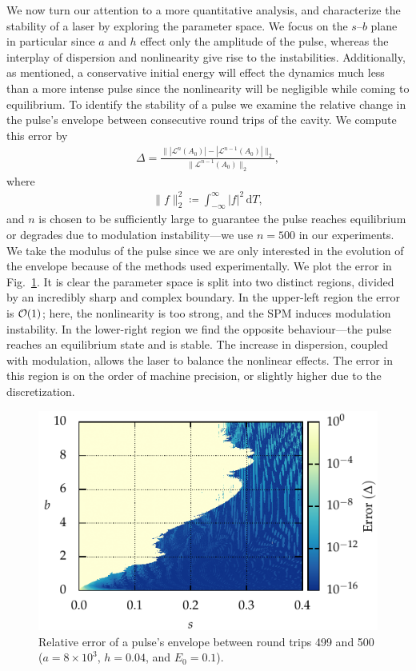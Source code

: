 \documentclass[9pt,twocolumn,twoside]{osajnl}
\let\originalleft\left
\let\originalright\right
\renewcommand{\left}{\mathopen{}\mathclose\bgroup\originalleft}
\renewcommand{\right}{\aftergroup\egroup\originalright}
\providecommand{\df}{\textrm{d}} %
\providecommand{\bigO}[1]{\ensuremath{\mathop{}\mathopen{}\mathcal{O}\mathopen{}\left(#1\right)}} %
\begin{document}
We now turn our attention to a more quantitative analysis, and characterize the stability of a laser by exploring the parameter space. We focus on the $s$--$b$ plane in particular since $a$ and $h$ effect only the amplitude of the pulse, whereas the interplay of dispersion and nonlinearity give rise to the instabilities. Additionally, as mentioned, a conservative initial energy will effect the dynamics much less than a more intense pulse since the nonlinearity will be negligible while coming to equilibrium. To identify the stability of a pulse we examine the relative change in the pulse's envelope between consecutive round trips of the cavity. We compute this error by
\begin{align}
	\Delta = \frac{\| |\mathcal{L}^n(A_0)| - |\mathcal{L}^{n-1}(A_0)| \|_2}{\| \mathcal{L}^{n-1}(A_0) \|_2},
	\label{eq:error}
\end{align}
where
\begin{align}
	\| f \|_2^2 \coloneqq \int_{-\infty}^\infty |f|^2 \, \df T,
\end{align}
and $n$ is chosen to be sufficiently large to guarantee the pulse reaches equilibrium or degrades due to modulation instability---we use $n = 500$ in our experiments. We take the modulus of the pulse since we are only interested in the evolution of the envelope because of the methods used experimentally. We plot the error in Fig.~\ref{fig:error}. It is clear the parameter space is split into two distinct regions, divided by an incredibly sharp and complex boundary. In the upper-left region the error is $\bigO{1}$; here, the nonlinearity is too strong, and the SPM induces modulation instability. In the lower-right region we find the opposite behaviour---the pulse reaches an equilibrium state and is stable. The increase in dispersion, coupled with modulation, allows the laser to balance the nonlinear effects. The error in this region is on the order of machine precision, or slightly higher due to the discretization.

\begin{figure}[tbp]
	\centering
	\includegraphics{Figures/ParamSpaceErr}
	\caption{Relative error of a pulse's envelope between round trips 499 and 500 ($a = 8 \times 10^3$, $h = 0.04$, and $E_0 = 0.1$).}
	\label{fig:error}
\end{figure}
\end{document}
